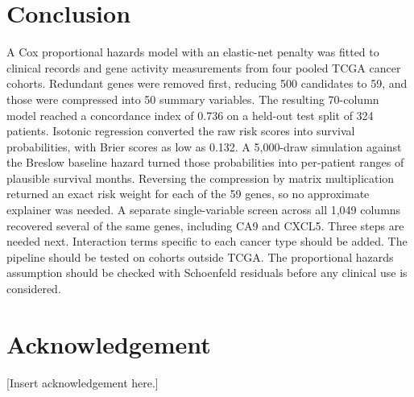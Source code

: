 \documentclass[10pt,a4paper]{article}
\begin{document}
\section{Conclusion}

A Cox proportional hazards model with an elastic-net penalty was fitted to
clinical records and gene activity measurements from four pooled TCGA cancer
cohorts. Redundant genes were removed first, reducing 500 candidates to 59, and
those were compressed into 50 summary variables. The resulting 70-column model
reached a concordance index of 0.736 on a held-out test split of 324 patients.
Isotonic regression converted the raw risk scores into survival probabilities,
with Brier scores as low as 0.132. A 5,000-draw simulation against the Breslow
baseline hazard turned those probabilities into per-patient ranges of plausible
survival months. Reversing the compression by matrix multiplication returned an
exact risk weight for each of the 59 genes, so no approximate explainer was
needed. A separate single-variable screen across all 1,049 columns recovered
several of the same genes, including CA9 and CXCL5. Three steps are needed next.
Interaction terms specific to each cancer type should be added. The pipeline
should be tested on cohorts outside TCGA. The proportional hazards assumption
should be checked with Schoenfeld residuals before any clinical use is
considered.

\section*{Acknowledgement}

[Insert acknowledgement here.]

\vspace{1em}


\end{document}
